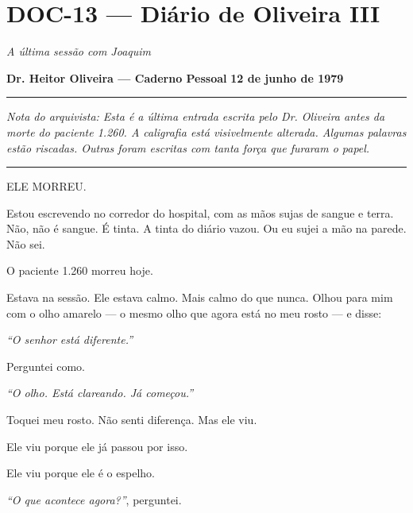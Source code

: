 \section*{\textbf{DOC-13} --- Diário de Oliveira III}

\noindent \textit{A última sessão com Joaquim}

\noindent \textbf{Dr. Heitor Oliveira --- Caderno Pessoal}
\textbf{12 de junho de 1979}

\vspace{0.5em}\noindent\rule{\textwidth}{0.5pt}\vspace{0.5em}

\noindent \textit{Nota do arquivista: Esta é a última entrada escrita pelo Dr. Oliveira antes da morte do paciente 1.260. A caligrafia está visivelmente alterada. Algumas palavras estão riscadas. Outras foram escritas com tanta força que furaram o papel.}

\vspace{0.5em}\noindent\rule{\textwidth}{0.5pt}\vspace{0.5em}

\noindent ELE MORREU.

\noindent Estou escrevendo no corredor do hospital, com as mãos sujas de sangue e terra. Não, não é sangue. É tinta. A tinta do diário vazou. Ou eu sujei a mão na parede. Não sei.

\noindent O paciente 1.260 morreu hoje.

\noindent Estava na sessão. Ele estava calmo. Mais calmo do que nunca. Olhou para mim com o olho amarelo --- o mesmo olho que agora está no meu rosto --- e disse:

\noindent \textit{\textquotedblleft{}O senhor está diferente.\textquotedblright{}}

\noindent Perguntei como.

\noindent \textit{\textquotedblleft{}O olho. Está clareando. Já começou.\textquotedblright{}}

\noindent Toquei meu rosto. Não senti diferença. Mas ele viu.

\noindent Ele viu porque ele já passou por isso.

\noindent Ele viu porque ele é o espelho.

\noindent \textit{\textquotedblleft{}O que acontece agora?\textquotedblright{}}, perguntei.

